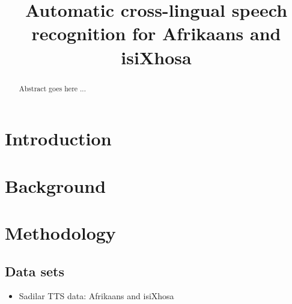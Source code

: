 \documentclass[conference]{IEEEtran}
\begin{document}
\title{Automatic cross-lingual speech recognition for Afrikaans and isiXhosa}
\author{
}
\maketitle



\begin{abstract}
    Abstract goes here ...
\end{abstract}



\section{Introduction}\label{sec:introduction}



\section{Background}\label{sec:background}



\section{Methodology}\label{sec:methodology}

\subsection{Data sets}
\begin{itemize}
    \item Sadilar TTS data: Afrikaans and isiXhosa
\end{itemize}
\end{document}
